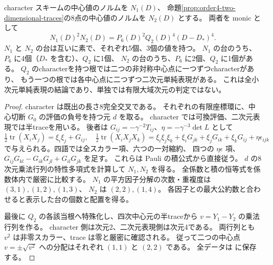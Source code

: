 \begin{proposition}[小次元表現の中心値の全体]
\label{prop:order4-small-rep-norms}
character スキームの中心値のノルムを $N_1(D)$、
命題\ref{prop:order4-two-dimensional-traces}の8点の中心値のノルムを $N_2(D)$ とする。
両者を monic として
\[
 N_1(D)^2 N_2(D)=P_6(D)^2Q_2(D)^4(D-D_*)^4.
\]
$N_1$ と $N_2$ の台は互いに素で、それぞれ5個、3個の値を持つ。
$N_1$ の台のうち、$P_6$ に4個（$D_*$ を含む）、$Q_2$ に1個、
$N_2$ の台のうち、$P_6$ に2個、$Q_2$ に1個がある。
$Q_2$ のcharacterを持つ根では二つの非対称中心点に一つずつcharacterがあり、
もう一つの根では各中心点に二つずつ二次元単純表現がある。
これは全小次元単純表現の結論であり、単独では有限大域次元の判定ではない。
\end{proposition}
\begin{proof}
character は既出の長さ8完全交叉である。
それぞれの有限座標環に、中心切断 $G_0$ の評価の負号を持つ元 $d$ を取る。
character では可換評価、二次元表現では半traceを用いる。
後者は $G_{ij}=-\gamma^{-2}T_{ij}$、$\eta=-\gamma^{-3}\det L$ として
\[
 \tfrac12\operatorname{tr}(X_iX_j)=\xi_i\xi_j+G_{ij},\quad
 \tfrac12\operatorname{tr}(X_iX_jX_k)
 =\xi_i\xi_j\xi_k+\xi_iG_{jk}+\xi_jG_{ik}+\xi_kG_{ij}+\eta\epsilon_{ijk}
\]
で与えられる。四語では全スカラー項、六つの一対縮約、
四つの $\eta\epsilon$ 項、
$G_{ij}G_{kl}-G_{ik}G_{jl}+G_{il}G_{jk}$ を足す。
これらは Pauli の積公式から直接従う。
$d$ の8次元乗法行列の特性多項式を計算して $N_1,N_2$ を得る。
全係数と積の恒等式を係数体内で厳密に比較する。
$N_1$ の平方因子分解の次数・重複度は $(3,1),(1,2),(1,3)$、
$N_2$ は $(2,2),(1,4)$。
各因子との最大公約数と合わせると表示した台の個数と配置を得る。

最後に $Q_2$ の各該当根へ特殊化し、四次中心元の半traceから
$v=Y_1-Y_2$ の乗法行列を作る。
character 側は次元2、二次元表現側は次元4である。
両行列とも $v^2$ は非零スカラー、trace は零と厳密に確認される。
従って二つの中心点 $v=\pm\sqrt{v^2}$ への分配はそれぞれ $(1,1)$ と $(2,2)$ である。
全データは  に保存する。
\end{proof}
